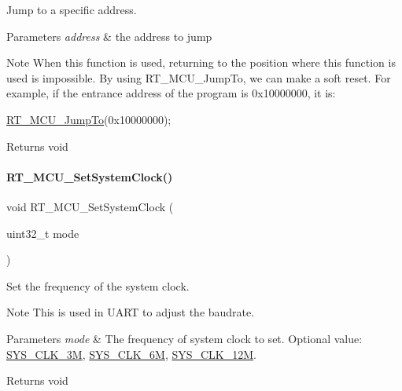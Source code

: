 Jump to a specific address. 


\begin{DoxyParams}{Parameters}
{\em address} & the address to jump \\
\hline
\end{DoxyParams}
\begin{DoxyNote}{Note}
When this function is used, returning to the position where this function is used is impossible. By using R\+T\+\_\+\+M\+C\+U\+\_\+\+Jump\+To, we can make a soft reset. For example, if the entrance address of the program is 0x10000000, it is\+: 
\begin{DoxyCode}
\mbox{\hyperlink{a00020_aa106e3c9181a65a83156bda31f4f61e9}{RT\_MCU\_JumpTo}}(0x10000000);
\end{DoxyCode}
 
\end{DoxyNote}
\begin{DoxyReturn}{Returns}
void 
\end{DoxyReturn}
\mbox{\label{a00020_a1e578ce669735935a1d505c0edf98221}} 
\paragraph{\texorpdfstring{R\+T\+\_\+\+M\+C\+U\+\_\+\+Set\+System\+Clock()}{RT\_MCU\_SetSystemClock()}}
{\footnotesize\ttfamily void R\+T\+\_\+\+M\+C\+U\+\_\+\+Set\+System\+Clock (\begin{DoxyParamCaption}\item[{uint32\+\_\+t}]{mode }\end{DoxyParamCaption})}



Set the frequency of the system clock. 

\begin{DoxyNote}{Note}
This is used in U\+A\+RT to adjust the baudrate. 
\end{DoxyNote}

\begin{DoxyParams}{Parameters}
{\em mode} & The frequency of system clock to set. Optional value\+: \mbox{\hyperlink{a00020_ae3a2d501b8662e11b969fb4a5e195e5baaac7754daa9ff2db35951f3539495122}{S\+Y\+S\+\_\+\+C\+L\+K\+\_\+3M}}, \mbox{\hyperlink{a00020_ae3a2d501b8662e11b969fb4a5e195e5bad1640aa8c46162a7551abca12293ef39}{S\+Y\+S\+\_\+\+C\+L\+K\+\_\+6M}}, \mbox{\hyperlink{a00020_ae3a2d501b8662e11b969fb4a5e195e5ba6c646c9a1e4c38ef0af6d576eacfb401}{S\+Y\+S\+\_\+\+C\+L\+K\+\_\+12M}}. \\
\hline
\end{DoxyParams}
\begin{DoxyReturn}{Returns}
void 
\end{DoxyReturn}
\mbox{\label{a00020_ad514417aa2e5a5d061a5eabeceae20c6}} 
